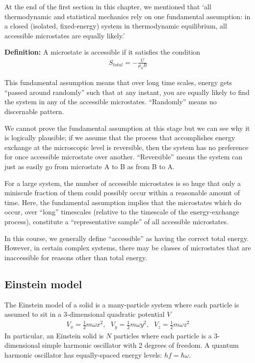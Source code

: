 \documentclass[11pt]{article}
\begin{document}
At the end of the first section in this chapter, we mentioned that `all thermodynamic and statistical mechanics rely on one fundamental assumption: in a closed (isolated, fixed-energy) system in thermodynamic equilibrium, all accessible microstates are equally likely.' 

\textbf{Definition:} A microstate is accessible if it satisfies the condition 
\begin{align*}
    S_{total} = - \frac{U}{\mu_0 B}
\end{align*}

This fundamental assumption means that over long time scales, energy gets ``passed around randomly'' such that at any instant, you are equally likely to find the system in any of the accessible microstates. ``Randomly'' means no discernable pattern. 

We cannot prove the fundamental assumption at this stage but we can see why it is logically plausible; if we assume that the process that accomplishes energy exchange at the microscopic level is reversible, then the system has no preference for once accessible microstate over another. ``Reversible'' means the system can just as easily go from microstate A to B as from B to A. 

For a large system, the number of accessible microstates is so huge that only a miniscule fraction of them could possibly occur within a reasonable amount of time. Here, the fundamental assumption implies that the microstates which do occur, over ``long'' timescales (relative to the timescale of the energy-exchange process), constitute a ``representative sample'' of all accessible microstates. 

In this course, we generally define ``accessible'' as having the correct total energy. However, in certain complex systems, there may be classes of microstates that are inaccessible for reasons other than total energy. 

\subsection{Einstein model}
The Einstein model of a solid is a many-particle system where each particle is assumed to sit in a 3-dimensional quadratic potential $V$
\begin{align*}
    V_x = \frac{1}{2}m\omega x^2, ~~~ V_y = \frac{1}{2}m\omega y^2, ~~~ V_z = \frac{1}{2}m \omega z^2
\end{align*}
In particular, an Einstein solid is $N$ particles where each particle is a 3-dimensional simple harmonic oscillator with 2 degrees of freedom. A quantum harmonic oscillator has equally-spaced energy levels: $hf = \hbar \omega$.
\end{document}

